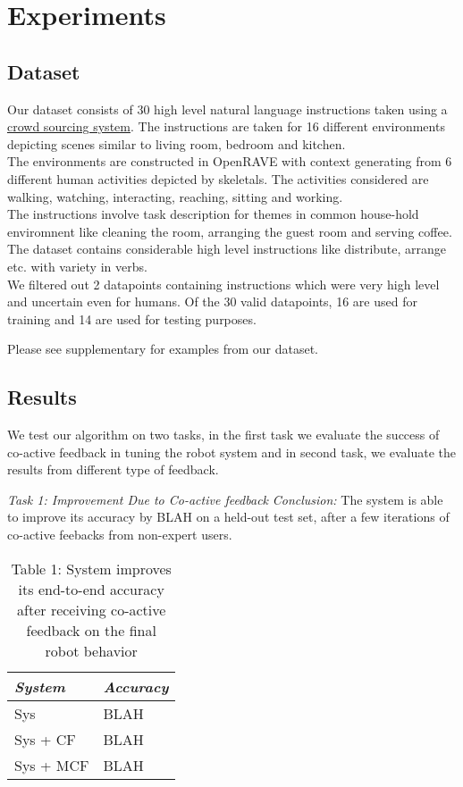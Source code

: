 \section{Experiments}
\subsection{Dataset}
Our dataset consists of 30 high level natural language instructions taken using a \href{http://52.25.65.189:9000/#/getFeedback}{crowd sourcing system}. The instructions are taken for 16 different environments depicting scenes similar to living room, bedroom and kitchen. \\
The environments are constructed in OpenRAVE with context generating from 6 different human activities depicted by skeletals. The activities considered are walking, watching, interacting, reaching, sitting and working. \\
The instructions involve task description for themes in common house-hold enviromnent like cleaning the room, arranging the guest room and serving coffee. The dataset contains considerable high level instructions like distribute, arrange etc. with variety in verbs.\\
We filtered out 2 datapoints containing instructions which were very high level and uncertain even for  humans. Of the 30 valid datapoints, 16 are used for training and 14 are used for testing purposes.  

Please see supplementary for examples from our dataset.

\subsection{Results} 
We test our algorithm on two tasks, in the first task we evaluate the success of co-active feedback in tuning the robot system and in second task, we evaluate the results from different type of feedback.

\noindent\textit{Task 1: Improvement Due to Co-active feedback}
\textit{Conclusion:} The system is able to improve its accuracy by BLAH on a held-out test set, after a few iterations of co-active feebacks from non-expert users.

\begin{table}
\label{tbl:tsk1}
\caption{Table 1: System improves its end-to-end accuracy after receiving co-active feedback on the final robot behavior}
\centering
\begin{tabular}{|l|l|}
\hline
\textit{System} & \textit{Accuracy} \\
\hline
Sys & BLAH \\
Sys + CF & BLAH \\
Sys + MCF & BLAH \\
\hline
\end{tabular}
\end{table}

